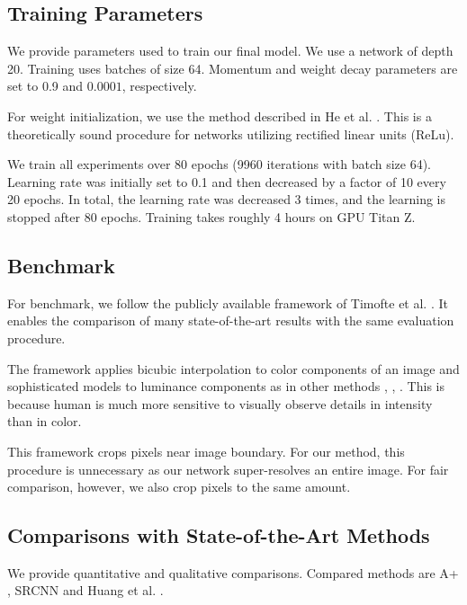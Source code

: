 \documentclass[10pt,twocolumn,letterpaper]{article}
\begin{document}
\subsection{Training Parameters}
We provide parameters used to train our final model. We use a network of depth 20. Training uses batches of size 64. Momentum and weight decay parameters are set to 0.9 and $0.0001$, respectively. 

For weight initialization, we use the method described in He et al. \cite{he2015delving}. This is a theoretically sound procedure for networks utilizing rectified linear units (ReLu).

We train all experiments over 80 epochs (9960 iterations with batch size 64). Learning rate was initially set to 0.1 and then decreased by a factor of 10 every 20 epochs. In total, the learning rate was decreased 3 times, and the learning
is stopped after 80 epochs. Training takes roughly 4 hours on GPU Titan Z. 


\subsection{Benchmark}
For benchmark, we follow the publicly available framework of Timofte et al. \cite{Timofte2013}. It enables the comparison of many state-of-the-art results with the same evaluation procedure.

The framework applies bicubic interpolation to color components of an image and sophisticated models to luminance components as in  other methods \cite{chang2004super}, \cite{glasner2009super}, \cite{zeyde2012single}. This is because human is much more sensitive to visually observe details in intensity than in color. 


This framework crops pixels near image boundary. For our method, this procedure is unnecessary as our network super-resolves an entire image. For fair comparison, however, we also crop pixels to the same amount.



\subsection{Comparisons with State-of-the-Art Methods}
We provide quantitative and qualitative comparisons. Compared methods are A+ \cite{Timofte}, SRCNN \cite{Dong2014} and Huang et al. \cite{Huang-CVPR-2015}.
\end{document}
